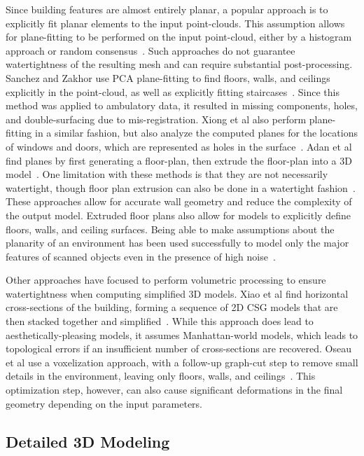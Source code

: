 \documentclass[12pt,onecolumn,oneside]{book}
\begin{document}
Since building features are almost entirely planar, a popular approach is to explicitly fit planar elements to the input point-clouds.  This assumption allows for plane-fitting to be performed on the input point-cloud, either by a histogram approach or random consensus~\cite{HistWallRecon,BasicPlaneFit}.  Such approaches do not guarantee watertightness of the resulting mesh and can require substantial post-processing.  Sanchez and Zakhor use PCA plane-fitting to find floors, walls, and ceilings explicitly in the point-cloud, as well as explicitly fitting staircases~\cite{Victors}. Since this method was applied to ambulatory data, it resulted in missing components, holes, and double-surfacing due to mis-registration.  Xiong et al also perform plane-fitting in a similar fashion, but also analyze the computed planes for the locations of windows and doors, which are represented as holes in the surface~\cite{Xiong13}.  Adan et al find planes by first generating a floor-plan, then extrude the floor-plan into a 3D model~\cite{WallFinder}.  One limitation with these methods is that they are not necessarily watertight, though floor plan extrusion can also be done in a watertight fashion~\cite{Mura14,Turner14,Cabral14}.  These approaches allow for accurate wall geometry and reduce the complexity of the output model. Extruded floor plans also allow for models to explicitly define floors, walls, and ceiling surfaces.  Being able to make assumptions about the planarity of an environment has been used successfully to model only the major features of scanned objects even in the presence of high noise~\cite{Lafarge13}.

Other approaches have focused to perform volumetric processing to ensure watertightness when computing simplified 3D models.  Xiao et al find horizontal cross-sections of the building, forming a sequence of 2D CSG models that are then stacked together and simplified~\cite{Museums}.  While this approach does lead to aesthetically-pleasing models, it assumes Manhattan-world models, which leads to topological errors if an insufficient number of cross-sections are recovered.  Oseau et al use a voxelization approach, with a follow-up graph-cut step to remove small details in the environment, leaving only floors, walls, and ceilings~\cite{Oesau13}.  This optimization step, however, can also cause significant deformations in the final geometry depending on the input parameters. 

\subsection{Detailed 3D Modeling}
\label{ssec:background_3dmodeling}
\end{document}
